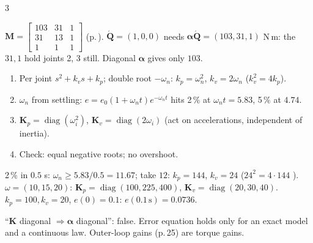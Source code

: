 \begin{multicols}{3}
\begin{wnfig}
\end{wnfig}
\begin{worked}[$\boldsymbol\alpha$ not diagonal: practical 3-link arm, $\mathbf q_0=(0,0,90^\circ)$]
$\mathbf M=\begin{bmatrix}103&31&1\\31&13&1\\1&1&1\end{bmatrix}$ (p.\,\pageref{w9:prac}). $\acute{\mathbf Q}=(1,0,0)$ needs $\boldsymbol\alpha\acute{\mathbf Q}=(103,31,1)$ N\,m: the $31,1$ hold joints 2, 3 still. Diagonal $\boldsymbol\alpha$ gives only $103$. \chk
\end{worked}
\begin{recipe}\label{w9:gain}
\begin{enumerate}
\item Per joint $s^2+k_vs+k_p$; double root $-\omega_n$: $k_p=\omega_n^2$, $k_v=2\omega_n$ ($k_v^2=4k_p$).
\item $\omega_n$ from settling: $e=e_0(1+\omega_nt)e^{-\omega_nt}$ hits 2\,\% at $\omega_nt=5.83$, 5\,\% at $4.74$. \chk
\item $\mathbf K_p=\operatorname{diag}(\omega_i^2)$, $\mathbf K_v=\operatorname{diag}(2\omega_i)$ (act on accelerations, independent of inertia).
\item Check: equal negative roots; no overshoot.
\end{enumerate}
\end{recipe}
\begin{worked}
2\,\% in $0.5$ s: $\omega_n\ge5.83/0.5=11.67$; take $12$: $k_p=144$, $k_v=24$ ($24^2=4\cdot144$ \checkmark). \chk\ $\omega=(10,15,20)$: $\mathbf K_p=\operatorname{diag}(100,225,400)$, $\mathbf K_v=\operatorname{diag}(20,30,40)$. \chk\ $k_p=100,k_v=20$, $e(0)=0.1$: $e(0.1\,\text{s})=0.0736$. \chk
\end{worked}
\begin{trap}
``$\mathbf K$ diagonal $\Rightarrow\boldsymbol\alpha$ diagonal'': false. Error equation holds only for an exact model and a continuous law. Outer-loop gains (p.\,25) are torque gains.
\end{trap}


\end{multicols}
